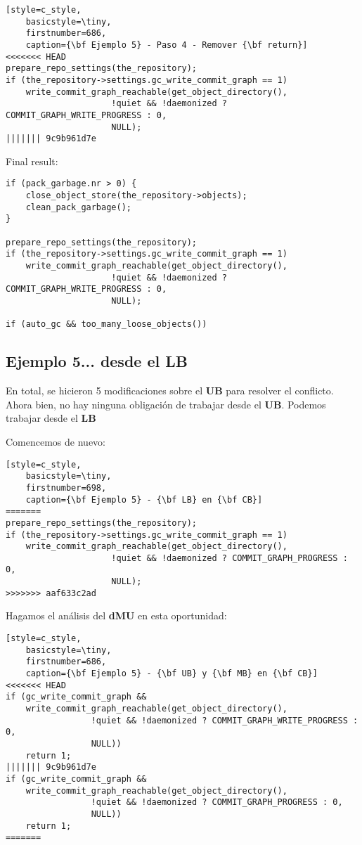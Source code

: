 \begin{lstlisting}[style=c_style,
	basicstyle=\tiny,
	firstnumber=686,
	caption={\bf Ejemplo 5} - Paso 4 - Remover {\bf return}]
<<<<<<< HEAD
prepare_repo_settings(the_repository);
if (the_repository->settings.gc_write_commit_graph == 1)
	write_commit_graph_reachable(get_object_directory(),
				     !quiet && !daemonized ? COMMIT_GRAPH_WRITE_PROGRESS : 0,
				     NULL);
||||||| 9c9b961d7e
\end{lstlisting}

Final result:
\begin{lstlisting}[style=c_style,
	basicstyle=\tiny,
	firstnumber=681,
	caption={\bf Ejemplo 5} - resultado final]
if (pack_garbage.nr > 0) {
	close_object_store(the_repository->objects);
	clean_pack_garbage();
}

prepare_repo_settings(the_repository);
if (the_repository->settings.gc_write_commit_graph == 1)
	write_commit_graph_reachable(get_object_directory(),
				     !quiet && !daemonized ? COMMIT_GRAPH_WRITE_PROGRESS : 0,
				     NULL);

if (auto_gc && too_many_loose_objects())
\end{lstlisting}

\subsection{Ejemplo 5... desde el LB}

En total, se hicieron 5 modificaciones sobre el {\bf UB} para resolver el conflicto. Ahora bien, no hay ninguna obligación 
de trabajar desde el {\bf UB}. Podemos trabajar desde el {\bf LB}

Comencemos de nuevo:

\begin{lstlisting}[style=c_style,
	basicstyle=\tiny,
	firstnumber=698,
	caption={\bf Ejemplo 5} - {\bf LB} en {\bf CB}]
=======
prepare_repo_settings(the_repository);
if (the_repository->settings.gc_write_commit_graph == 1)
	write_commit_graph_reachable(get_object_directory(),
				     !quiet && !daemonized ? COMMIT_GRAPH_PROGRESS : 0,
				     NULL);
>>>>>>> aaf633c2ad
\end{lstlisting}

Hagamos el análisis del {\bf dMU} en esta oportunidad:

\begin{lstlisting}[style=c_style,
	basicstyle=\tiny,
	firstnumber=686,
	caption={\bf Ejemplo 5} - {\bf UB} y {\bf MB} en {\bf CB}]
<<<<<<< HEAD
if (gc_write_commit_graph &&
    write_commit_graph_reachable(get_object_directory(),
				 !quiet && !daemonized ? COMMIT_GRAPH_WRITE_PROGRESS : 0,
				 NULL))
	return 1;
||||||| 9c9b961d7e
if (gc_write_commit_graph &&
    write_commit_graph_reachable(get_object_directory(),
				 !quiet && !daemonized ? COMMIT_GRAPH_PROGRESS : 0,
				 NULL))
	return 1;
=======
\end{lstlisting}

